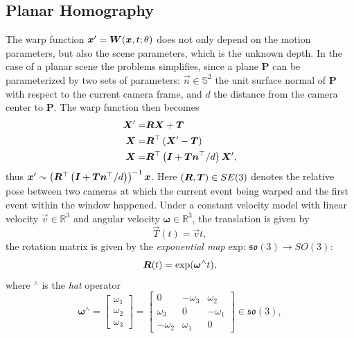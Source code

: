 \subsection{Planar Homography}

\label{sec:planar_homo}
The warp function $\vec{x}'=\mat{W}(\vec{x},t;\theta)$ does
not only depend on the motion parameters, but also the scene
parameters, which is the unknown depth.  In the case of a planar scene
the problems simplifies, since a plane $\mathbf{P}$ can be
parameterized by two sets of parameters: $\vec{n}\in\mathbb{S}^2$ the
unit surface normal of $\mathbf{P}$ with respect to the current camera
frame, and $d$ the distance from the camera center to
$\mathbf{P}$. The warp function then becomes
\begin{align}
  \vec{X}'=&\mat{R}\vec{X}+\vec{T}\\
  \vec{X}=&\mat{R}^\top\left(\vec{X}'-\vec{T}\right)\\
  \vec{X}=&\mat{R}^\top\left(\mat{I}+\vec{T}\vec{n}^\top/d\right)\vec{X}',  \label{eq:planar_homo_0}
\end{align}
thus
$\vec{x}'\sim\left(\mat{R}^\top\left(\mat{I}+\vec{T}\vec{n}^\top/d\right)\right)^{-1}\vec{x}$.
Here $(\mat{R}, \vec{T})\in SE(3)$ denotes the relative pose between
two cameras at which the current event being warped and the first
event within the window happened. Under a constant velocity model with
linear velocity $\vec{v}\in\mathbb{R}^3$ and angular velocity
$\bm{\omega}\in\mathbb{R}^3$, the translation is given by
\begin{equation}
  \label{eq:translation}
  \vec{T}(t)=\vec{v}t,
\end{equation}
the rotation matrix is given by the \textit{exponential map} exp:
$\mathfrak{so}(3)\rightarrow SO(3)$:
\begin{equation}
  \label{eq:rotation}
  \mat{R}(t)=\mathrm{exp}(\bm{\omega}^\wedge t),
\end{equation}
where $^\wedge$ is the \textit{hat} operator
\begin{equation}
  \label{eq:hat}
  \bm{\omega}^\wedge=
  \begin{bmatrix}
    \omega_1\\\omega_2\\\omega_3
  \end{bmatrix}
  =
  \begin{bmatrix}
    0&-\omega_3&\omega_2\\
    \omega_3&0&-\omega_1\\
    -\omega_2&\omega_1&0
  \end{bmatrix}
  \in\mathfrak{so}(3),
\end{equation}

